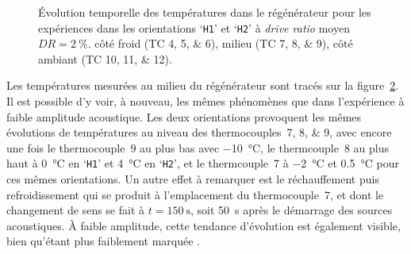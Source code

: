 %    

\begin{figure}[!ht]
    \centering
	\begin{subfigure}{\textwidth}
		\centering
        
		\caption{}
		\label{fig:Acou_CHXin_H1H2_Mid}
	\end{subfigure}		
	\begin{subfigure}{\textwidth}
		\centering
        
		\caption{}
		\label{fig:Acou_Regmid_H1H2_Mid}
	\end{subfigure}
	\begin{subfigure}{\textwidth}
		\centering
        
		\caption{}
		\label{fig:Acou_AHXin_H1H2_Mid}
	\end{subfigure}	
    \caption{\'Evolution temporelle des températures dans le régénérateur pour les expériences dans les orientations `\texttt{H1}' et `\texttt{H2}' à  \textit{drive ratio} moyen $DR=\qty{2}{\percent}$.  côté froid (TC \numlist{4;5;6}),  milieu (TC \numlist{7;8;9}),  côté ambiant (TC \numlist{10;11;12}).} 
    \label{fig:Acou_H1H2_Mid}
\end{figure}

Les températures mesurées au milieu du régénérateur sont tracés sur la figure~\ref{fig:Acou_Regmid_H1H2_Mid}. Il est possible d'y voir, à nouveau, les mêmes phénomènes que dans l'expérience à faible amplitude acoustique. Les deux orientations provoquent les mêmes évolutions de températures au niveau des thermocouples~\numlist{7;8;9}, avec encore une fois le thermocouple~9 au plus bas avec \qty{-10}{\degreeCelsius}, le thermcouple~8 au plus haut à \qty{0}{\degreeCelsius} en `\texttt{H1}' et \qty{4}{\degreeCelsius} en `\texttt{H2}', et le thermcouple~7 à \qty{-2}{\degreeCelsius} et \qty{.5}{\degreeCelsius} pour ces mêmes orientations. Un autre effet à remarquer est le réchauffement puis refroidissement qui se produit à l'emplacement du thermocouple~7, et dont le changement de sens se fait à $t=\qty{150}{\second}$, soit \qty{50}{\second} après le démarrage des sources acoustiques. À faible amplitude, cette tendance d'évolution est également visible, bien qu'étant plus faiblement marquée . 

